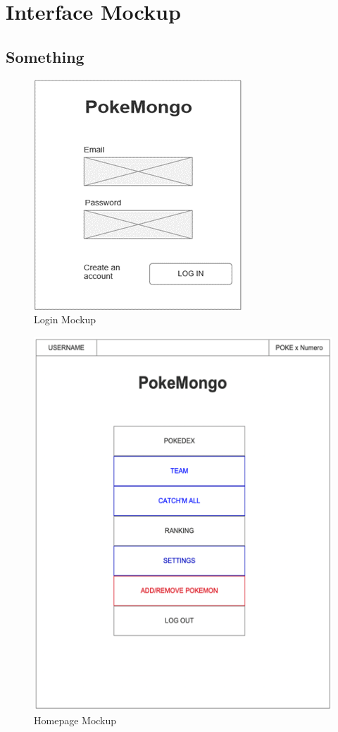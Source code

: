 \chapter{Interface Mockup}
\section{Something}

\begin{figure}[h]
    \centering
    \includegraphics{img/Picture1.png}
    \caption{Login Mockup}
\end{figure}

\begin{figure}[h]
    \centering
    \includegraphics{img/Picture2.png}
    \caption{Homepage Mockup}
\end{figure}

